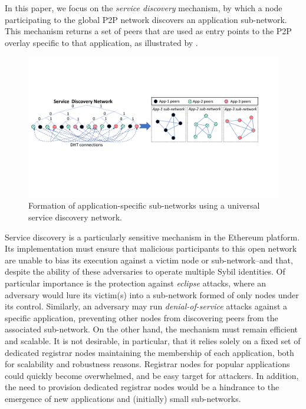In this paper, we focus on the \emph{service discovery} mechanism, by which a node participating to the global P2P network discovers an application sub-network.
This mechanism returns a set of peers that are used as entry points to the P2P overlay specific to that application, as illustrated by .

\begin{figure}[b!]
    \includegraphics[width=1\linewidth]{img/subnetwork}
    \caption{Formation of application-specific sub-networks using a universal service discovery network.
    }
    \label{fig:subnetwork}
\end{figure}

Service discovery is a particularly sensitive mechanism in the Ethereum platform.
Its implementation must ensure that malicious participants to this open network are unable to bias its execution against a victim node or sub-network--and that, despite the ability of these adversaries to operate multiple Sybil identities.
Of particular importance is the protection against \emph{eclipse} attacks, where an adversary would lure its victim(s) into a sub-network formed of only nodes under its control. %
Similarly, an adversary may run \emph{denial-of-service} attacks against a specific application, preventing other nodes from discovering peers from the associated sub-network.
On the other hand, the mechanism must remain efficient and scalable.
It is not desirable, in particular, that it relies solely on a fixed set of dedicated registrar nodes maintaining the membership of each application, both for scalability and robustness reasons. Registrar nodes for popular applications could quickly become overwhelmed, and be easy target for attackers.
In addition, the need to provision dedicated registrar nodes would be a hindrance to the emergence of new applications and (initially) small sub-networks.

